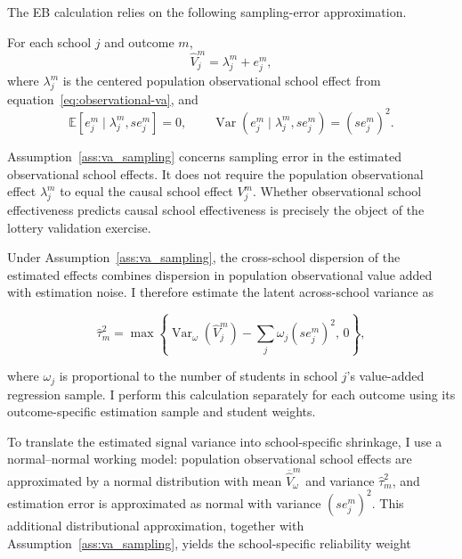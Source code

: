 \documentclass[a4paper, article, english, oneside, unknownkeysallowed, 12pt]{memoir}
\begin{document}
The EB calculation relies on the following sampling-error approximation.

\begin{assumption}
\label{ass:va_sampling}

For each school $j$ and outcome $m$,
\[
    \widehat V_j^m
    =
    \lambda_j^m + e_j^m,
\]
where $\lambda_j^m$ is the centered population observational school effect from
equation~\eqref{eq:observational-va}, and
\[
    \mathbb E
    \left[
        e_j^m
        \mid
        \lambda_j^m,se_j^m
    \right]
    =0,
    \qquad
    \operatorname{Var}
    \left(
        e_j^m
        \mid
        \lambda_j^m,se_j^m
    \right)
    =
    (se_j^m)^2.
\]
\end{assumption}

Assumption~\ref{ass:va_sampling} concerns sampling error in the estimated observational
school effects. It does not require the population observational effect $\lambda_j^m$ to
equal the causal school effect $V_j^m$. Whether observational school effectiveness
predicts causal school effectiveness is precisely the object of the lottery validation
exercise.

Under Assumption~\ref{ass:va_sampling}, the cross-school dispersion of the estimated
effects combines dispersion in population observational value added with estimation
noise. I therefore estimate the latent across-school variance as

\begin{equation}
    \widehat{\tau}_m^2
    =
    \max
    \left\{
        \operatorname{Var}_{\omega}
        \left(
            \widehat V_j^m
        \right)
        -
        \sum_j
        \omega_j
        (se_j^m)^2,
        \,
        0
    \right\},
    \label{eq:eb-latent-variance}
\end{equation}

where $\omega_j$ is proportional to the number of students in school $j$'s value-added
regression sample. I perform this calculation separately for each outcome using its
outcome-specific estimation sample and student weights.

To translate the estimated signal variance into school-specific shrinkage, I use a
normal--normal working model: population observational school effects are approximated
by a normal distribution with mean $\overline{\widehat V}_{\omega}^m$ and variance
$\widehat\tau_m^2$, and estimation error is approximated as normal with variance
$(se_j^m)^2$. This additional distributional approximation, together with
Assumption~\ref{ass:va_sampling}, yields the school-specific reliability weight
\end{document}
